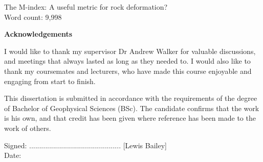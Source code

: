 \documentclass[a4paper,12pt,twoside]{report}
\numberwithin{equation}{chapter}
\begin{document}
\vspace{3cm}
\begin{center}
{\huge The M-index: A useful metric for rock deformation?}
\\
\vspace{1cm}
{\large Word count: 9,998}
\vspace{3cm}

\begin{Large}
\textbf{Acknowledgements}
\end{Large}

I would like to thank my supervisor Dr Andrew Walker for valuable discussions, and meetings that always lasted as long as they needed to. I would also like to thank my coursemates and lecturers, who have made this course enjoyable and engaging from start to finish.
  
\vspace{3cm}
\noindent
\begin{Large}
\end{Large}

This dissertation is submitted in accordance with the requirements of the degree of Bachelor of Geophysical Sciences (BSc). The candidate confirms that the work is his own, and that credit has been given where reference has been made to the work of others. 


\vspace{1cm}
\noindent
Signed: .............................................. [Lewis Bailey]\\ Date: 

\end{center}


\begin{abstract}
I created a \texttt{Matlab} toolbox to aid in quantitative texture strength analysis by allowing calculation of three texture strength indices using both viscoplastic self-consistent (VPSC) numerical models, and orientation data collected by electron backscatter diffraction (EBSD) from field samples as input. Using this toolbox I analysed the affect of calculation parameters, such as the number of grains $n$, on the value of the texture index (J-index), and the continuous and discrete M-indices. I found that for convergence for all indices, the number of grains required is $n \approx$ 1,000 or greater, which also results in a standard deviation close to zero. I found the impact of bin size on the discrete M-index to be significant, with reduction from 3$^\circ$ to 0.25$^\circ$ resulting in a $\sim$50\% difference in index value. I determined the indices as a function of strain for olivine, quartz and post-perovskite using VPSC models, and found that in general the indices increase monotonically with strain, although a numerical issue causes the discrete M-index to be multivalued in the quartz case. I used these relationships to predict strain for EBSD datasets. Finally I established a relationship with two elastic anisotropy indices with strain, and in turn to the texture indices. 
\end{abstract}
\end{document}
